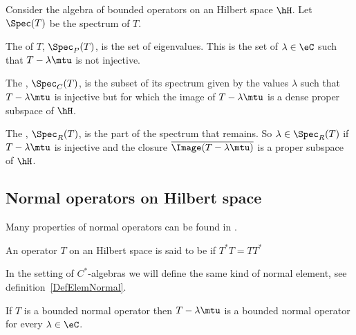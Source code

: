 \begin{definition}
    Consider the algebra of bounded operators on an Hilbert space \( \hH\). Let \( \Spec(T)\) be the spectrum of \( T\).

    The  of \( T\), \( \Spec_P(T)\), is the set of eigenvalues. This is the set of \( \lambda\in\eC\) such that \( T-\lambda\mtu\) is not injective.

    The , \( \Spec_C(T)\), is the subset of its spectrum given by the values \( \lambda\) such that \( T-\lambda\mtu\) is injective but for which the image of \( T-\lambda\mtu\) is a dense proper subspace of \( \hH\).

    The , $\Spec_R(T)$, is the part of the spectrum that remains. So \( \lambda\in\Spec_R(T)\) if \( T-\lambda\mtu\) is injective and the closure \( \overline{ \Image(T-\lambda\mtu) }\) is a proper subspace of \( \hH\).
\end{definition}

\subsection{Normal operators on Hilbert space}

Many properties of normal operators can be found in \cite{AndrewGreen}.

\begin{definition}  \label{DefFQFKZbB}
    An operator \( T\) on an Hilbert space is said to be  if \( T^*T=TT^*\)
\end{definition}
In the setting of \( C^*\)-algebras we will define the same kind of normal element, see definition~\ref{DefElemNormal}.

\begin{proposition}
    If \( T\) is a bounded normal operator then \( T-\lambda\mtu\) is a bounded normal operator for every \( \lambda\in\eC\).
\end{proposition}


